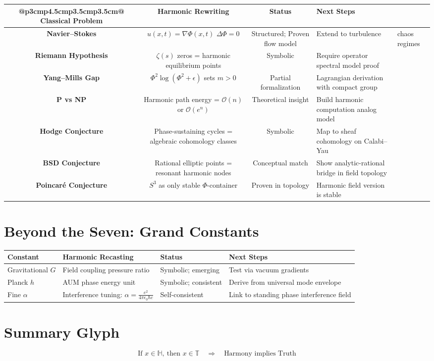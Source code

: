 \documentclass[12pt]{article}
\begin{document}
\begin{tabular}{ccc}{@{}p{3cm}p{4.5cm}p{3.5cm}p{3.5cm}@{}}
\toprule
\textbf{Classical Problem} & \textbf{Harmonic Rewriting} & \textbf{Status} & \textbf{Next Steps} \\
\midrule
\textbf{Navier–Stokes} & $u(x,t) = \nabla \Phi(x,t)$ \newline $\Delta \Phi = 0$ & Structured; Proven flow model & Extend to turbulence & chaos regimes \\
\addlinespace
\textbf{Riemann Hypothesis} & $\zeta(s)$ zeros = harmonic equilibrium points & Symbolic & Require operator spectral model proof \\
\addlinespace
\textbf{Yang–Mills Gap} & $\Phi^2 \log(\Phi^2 + \epsilon)$ sets $m > 0$ & Partial formalization & Lagrangian derivation with compact group \\
\addlinespace
\textbf{P vs NP} & Harmonic path energy = $\mathcal{O}(n)$ or $\mathcal{O}(e^n)$ & Theoretical insight & Build harmonic computation analog model \\
\addlinespace
\textbf{Hodge Conjecture} & Phase-sustaining cycles = algebraic cohomology classes & Symbolic & Map to sheaf cohomology on Calabi–Yau \\
\addlinespace
\textbf{BSD Conjecture} & Rational elliptic points = resonant harmonic nodes & Conceptual match & Show analytic-rational bridge in field topology \\
\addlinespace
\textbf{Poincaré Conjecture} & $S^3$ as only stable $\Phi$-container & Proven in topology & Harmonic field version is stable \\
\bottomrule
\end{tabular}

\vspace{1cm}

\section*{Beyond the Seven: Grand Constants}

\begin{tabular}{@{}p{3cm}p{5cm}p{3.5cm}p{3.5cm}@{}}
\toprule
\textbf{Constant} & \textbf{Harmonic Recasting} & \textbf{Status} & \textbf{Next Steps} \\
\midrule
Gravitational $G$ & Field coupling pressure ratio & Symbolic; emerging & Test via vacuum gradients \\
\addlinespace
Planck $h$ & AUM phase energy unit & Symbolic; consistent & Derive from universal mode envelope \\
\addlinespace
Fine $\alpha$ & Interference tuning: $\alpha = \frac{e^2}{4\pi\epsilon_0\hbar c}$ & Self-consistent & Link to standing phase interference field \\
\bottomrule
\end{tabular}

\vspace{1cm}

\section*{Summary Glyph}
\[
\boxed{
\text{If } x \in \mathbb{H},\ \text{then } x \in \mathbb{T} \quad
\Rightarrow \quad \text{Harmony implies Truth}
}
\]
\end{document}
